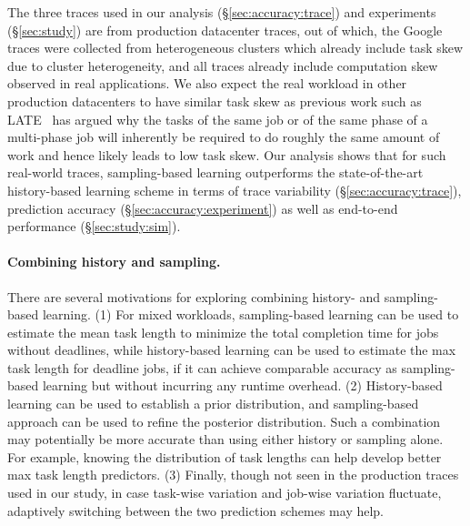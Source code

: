 {
The three traces used in our analysis (\S\ref{sec:accuracy:trace}) and experiments
(\S\ref{sec:study}) are from production datacenter traces, out of
which, the Google traces were collected from 
heterogeneous clusters which already include task skew due to cluster
heterogeneity,
and all traces {already} include computation skew observed in 
real applications.
%
We also expect the real workload in other production datacenters to have similar
task skew as previous work such as LATE~\cite{late:osdi08} has argued 
why the tasks of the same job or of the same phase of a multi-phase
job will inherently be required to do roughly the same amount of work
and hence likely leads to low task skew.
\fi
Our analysis shows that for such real-world
traces, sampling-based learning outperforms the state-of-the-art
history-based learning scheme in terms of trace variability (\S\ref{sec:accuracy:trace}),
prediction accuracy (\S\ref{sec:accuracy:experiment}) as well as
end-to-end performance (\S\ref{sec:study:sim}).


\fi

\paragraph{Combining history and sampling.}
There are several motivations for exploring combining history-
and sampling-based learning. 
%
(1) For mixed workloads, sampling-based learning can be used
to estimate the mean task length to minimize the total completion
time for jobs without deadlines, while history-based learning can be
used to estimate the max task length for deadline jobs, if it
can achieve comparable accuracy as 
sampling-based learning but without incurring any runtime overhead.
(2) History-based learning can be used to establish a prior
distribution, and sampling-based approach can be used to refine the
posterior distribution. Such a combination may potentially be more accurate
than using either history or sampling alone. For example,
knowing the distribution of task lengths can help develop better
max task length predictors.
(3) Finally, though not seen in the production traces used in our study,
in case task-wise variation and job-wise variation fluctuate, adaptively switching
between the two prediction schemes may help.


}

